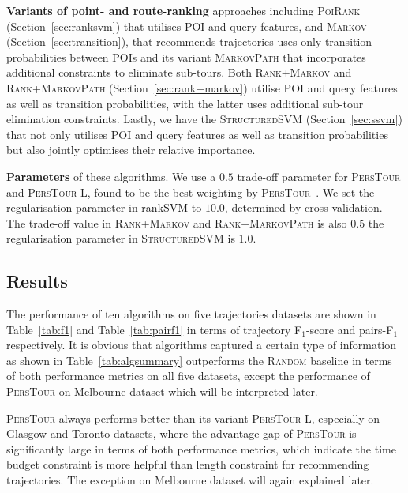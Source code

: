 {\bf Variants of point- and route-ranking} approaches including \textsc{PoiRank} (Section~\ref{sec:ranksvm})
that utilises POI and query features, 
and \textsc{Markov} (Section~\ref{sec:transition}), 
that recommends trajectories uses only transition probabilities between POIs  
and its variant \textsc{MarkovPath} that incorporates additional constraints to eliminate sub-tours.
Both \textsc{Rank+Markov} and \textsc{Rank+MarkovPath} (Section~\ref{sec:rank+markov})
utilise POI and query features as well as transition probabilities, with the latter uses
additional sub-tour elimination constraints.
Lastly, we have the \textsc{StructuredSVM} (Section~\ref{sec:ssvm}) that not only utilises POI and query features 
as well as transition probabilities but also jointly optimises their relative importance.

{\bf Parameters} of these algorithms.
We use a $0.5$ trade-off parameter for \textsc{PersTour} and \textsc{PersTour-L},
found to be the best weighting by \textsc{PersTour}~\cite{ijcai15}. 
We set the regularisation parameter in rankSVM to  $10.0$, determined by cross-validation.
The trade-off value in \textsc{Rank+Markov} and \textsc{Rank+MarkovPath} is also $0.5$
the regularisation parameter in \textsc{StructuredSVM} is $1.0$.


\subsection{Results}
\label{sec:result}


The performance of ten algorithms on five trajectories datasets are shown in Table~\ref{tab:f1}
and Table~\ref{tab:pairf1} in terms of trajectory F$_1$-score and pairs-F$_1$ respectively.
%
It is obvious that algorithms captured a certain type of information as shown in Table~\ref{tab:algsummary}
outperforms the \textsc{Random} baseline in terms of both performance metrics on all five datasets,
except the performance of \textsc{PersTour}\cite{ijcai15} on Melbourne dataset which will be interpreted later.

\textsc{PersTour}\cite{ijcai15} always performs better than its variant \textsc{PersTour-L},
especially on Glasgow and Toronto datasets, where the advantage gap of \textsc{PersTour}
is significantly large in terms of both performance metrics,
%
which indicate the time budget constraint is more helpful than length constraint for recommending trajectories.
The exception on Melbourne dataset will again explained later.


